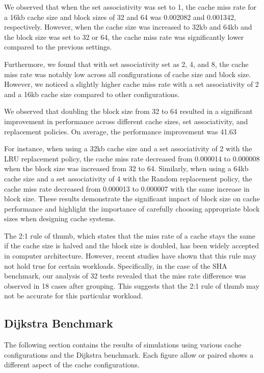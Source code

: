 \documentclass[conference]{IEEEtran}
\begin{document}
We observed that when the set associativity was set to 1, the cache miss rate for a 16kb cache size and block sizes of 32 and 64 was 0.002082 and 0.001342, respectively. However, when the cache size was increased to 32kb and 64kb and the block size was set to 32 or 64, the cache miss rate was significantly lower compared to the previous settings.

Furthermore, we found that with set associativity set as 2, 4, and 8, the cache miss rate was notably low across all configurations of cache size and block size. However, we noticed a slightly higher cache miss rate with a set associativity of 2 and a 16kb cache size compared to other configurations.

We observed that doubling the block size from 32 to 64 resulted in a significant improvement in performance across different cache sizes, set associativity, and replacement policies. On average, the performance improvement was 41.63%

For instance, when using a 32kb cache size and a set associativity of 2 with the LRU replacement policy, the cache miss rate decreased from 0.000014 to 0.000008 when the block size was increased from 32 to 64. Similarly, when using a 64kb cache size and a set associativity of 4 with the Random replacement policy, the cache miss rate decreased from 0.000013 to 0.000007 with the same increase in block size. These results demonstrate the significant impact of block size on cache performance and highlight the importance of carefully choosing appropriate block sizes when designing cache systems.

The 2:1 rule of thumb, which states that the miss rate of a cache stays the same if the cache size is halved and the block size is doubled, has been widely accepted in computer architecture. However, recent studies have shown that this rule may not hold true for certain workloads. Specifically, in the case of the SHA benchmark, our analysis of 32 tests revealed that the miss rate difference was observed in 18 cases after grouping. This suggests that the 2:1 rule of thumb may not be accurate for this particular workload.


\subsection{Dijkstra Benchmark}

The following section contains the results of simulations using various cache configurations and the Dijkstra benchmark. Each figure allow or paired shows a different aspect of the cache configurations.
\end{document}
